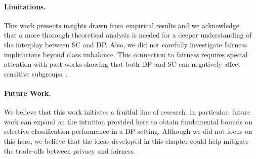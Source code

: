 \paragraph{Limitations.} This work presents insights drawn from empirical results and we acknowledge that a more thorough theoretical analysis is needed for a deeper understanding of the interplay between SC and DP. Also, we did not carefully investigate fairness implications beyond class imbalance. This connection to fairness requires special attention with past works showing that both DP and SC can negatively affect sensitive subgroups~\citep{jones2020selective, bagdasaryan2019differential}.

\paragraph{Future Work.} We believe that this work initiates a fruitful line of research. In particular, future work can expand on the intuition provided here to obtain fundamental bounds on selective classification performance in a DP setting. Although we did not focus on this here, we believe that the ideas developed in this chapter could help mitigate the trade-offs between privacy and fairness.
